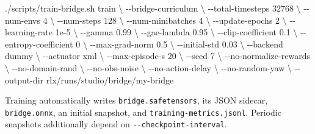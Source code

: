 \documentclass[
  american,
  11pt,
  letterpaper,
]{article}
\newenvironment{Shaded}{\begin{snugshade}}{\end{snugshade}}
\newcommand{\AttributeTok}[1]{\textcolor[rgb]{0.13,0.29,0.53}{#1}}
\newcommand{\DataTypeTok}[1]{\textcolor[rgb]{0.13,0.29,0.53}{#1}}
\newcommand{\ExtensionTok}[1]{#1}
\newcommand{\NormalTok}[1]{#1}
\renewenvironment{Shaded}{\par\smallskip}{\par\smallskip}
\begin{document}
\begin{Shaded}
\begin{Highlighting}[]
\ExtensionTok{./scripts/train{-}bridge.sh}\NormalTok{ train }\DataTypeTok{\textbackslash{}}
  \AttributeTok{{-}{-}bridge{-}curriculum} \DataTypeTok{\textbackslash{}}
  \AttributeTok{{-}{-}total{-}timesteps}\NormalTok{ 32768 }\DataTypeTok{\textbackslash{}}
  \AttributeTok{{-}{-}num{-}envs}\NormalTok{ 4 }\DataTypeTok{\textbackslash{}}
  \AttributeTok{{-}{-}num{-}steps}\NormalTok{ 128 }\DataTypeTok{\textbackslash{}}
  \AttributeTok{{-}{-}num{-}minibatches}\NormalTok{ 4 }\DataTypeTok{\textbackslash{}}
  \AttributeTok{{-}{-}update{-}epochs}\NormalTok{ 2 }\DataTypeTok{\textbackslash{}}
  \AttributeTok{{-}{-}learning{-}rate}\NormalTok{ 1e{-}5 }\DataTypeTok{\textbackslash{}}
  \AttributeTok{{-}{-}gamma}\NormalTok{ 0.99 }\DataTypeTok{\textbackslash{}}
  \AttributeTok{{-}{-}gae{-}lambda}\NormalTok{ 0.95 }\DataTypeTok{\textbackslash{}}
  \AttributeTok{{-}{-}clip{-}coefficient}\NormalTok{ 0.1 }\DataTypeTok{\textbackslash{}}
  \AttributeTok{{-}{-}entropy{-}coefficient}\NormalTok{ 0 }\DataTypeTok{\textbackslash{}}
  \AttributeTok{{-}{-}max{-}grad{-}norm}\NormalTok{ 0.5 }\DataTypeTok{\textbackslash{}}
  \AttributeTok{{-}{-}initial{-}std}\NormalTok{ 0.03 }\DataTypeTok{\textbackslash{}}
  \AttributeTok{{-}{-}backend}\NormalTok{ dummy }\DataTypeTok{\textbackslash{}}
  \AttributeTok{{-}{-}actuator}\NormalTok{ xml }\DataTypeTok{\textbackslash{}}
  \AttributeTok{{-}{-}max{-}episode{-}s}\NormalTok{ 20 }\DataTypeTok{\textbackslash{}}
  \AttributeTok{{-}{-}seed}\NormalTok{ 7 }\DataTypeTok{\textbackslash{}}
  \AttributeTok{{-}{-}no{-}normalize{-}rewards} \DataTypeTok{\textbackslash{}}
  \AttributeTok{{-}{-}no{-}domain{-}rand} \DataTypeTok{\textbackslash{}}
  \AttributeTok{{-}{-}no{-}obs{-}noise} \DataTypeTok{\textbackslash{}}
  \AttributeTok{{-}{-}no{-}action{-}delay} \DataTypeTok{\textbackslash{}}
  \AttributeTok{{-}{-}no{-}random{-}yaw} \DataTypeTok{\textbackslash{}}
  \AttributeTok{{-}{-}output{-}dir}\NormalTok{ rlx/runs/studio/bridge/my{-}bridge}
\end{Highlighting}
\end{Shaded}

Training automatically writes
\texttt{bridge.s\allowbreak{}afetenso\allowbreak{}rs}, its JSON sidecar,
\texttt{bridge.onnx}, an initial snapshot, and
\texttt{training\allowbreak{}-\allowbreak{}metrics.\allowbreak{}jsonl}.
Periodic snapshots additionally depend on
\texttt{-\allowbreak{}-\allowbreak{}checkpoi\allowbreak{}nt-\allowbreak{}interval\allowbreak{}}.
\end{document}
